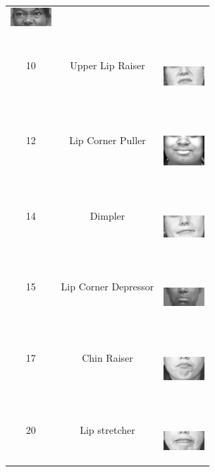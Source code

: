 \documentclass[10pt, conference, compsocconf]{IEEEtran}
\begin{document}
\begin{table}
\begin{tabular}{ccl}
\begin{minipage} {0.1\textwidth}
			\includegraphics[width=0.6in]{AUimage/AU9.png}
		\end{minipage}\\
		10 & Upper Lip Raiser & \ \ \ \begin{minipage} {0.1\textwidth}
			\includegraphics[width=0.6in]{AUimage/AU10.png}
		\end{minipage}\\
		12 & Lip Corner Puller & \ \ \ \begin{minipage} {0.1\textwidth}
			\includegraphics[width=0.6in]{AUimage/AU12.png}
		\end{minipage}\\
		14 & Dimpler & \ \ \ \begin{minipage} {0.1\textwidth}
			\includegraphics[width=0.6in]{AUimage/AU14.png}
		\end{minipage}\\
		15 & Lip Corner Depressor & \ \ \ \begin{minipage} {0.1\textwidth}
			\includegraphics[width=0.6in]{AUimage/AU15.png}
		\end{minipage}\\
		17 & Chin Raiser & \ \ \ \begin{minipage} {0.1\textwidth}
			\includegraphics[width=0.6in]{AUimage/AU17.png}
		\end{minipage}\\
		20 & Lip stretcher & \ \ \ \begin{minipage} {0.1\textwidth}
			\includegraphics[width=0.6in]{AUimage/AU20.png}

\end{minipage}
\end{tabular}
\end{table}
\end{document}

